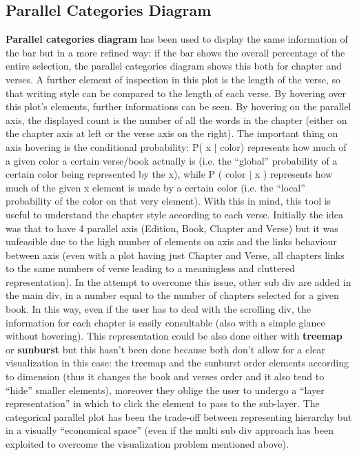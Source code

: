 \documentclass[sigchi]{article}
\begin{document}
\subsection{Parallel Categories Diagram}
\textbf{Parallel categories diagram} \cite{catplot} has been used to display the same information of the bar but in a more refined way: if the bar shows the overall percentage of the entire selection, the parallel categories diagram shows this both for chapter and verses. A further element of inspection in this plot is the length of the verse, so that writing style can be compared to the length of each verse. By hovering over this plot’s elements, further informations can be seen. By hovering on the parallel axis, the displayed count is the number of all the words in the chapter (either on the chapter axis at left or the verse axis on the right). The important thing on axis hovering is the conditional probability: 
P( x $|$ color) represents how much of a given color a certain verse/book actually is (i.e. the “global” probability of a certain color being represented by the x), while P ( color $|$ x ) represents how much of the given x element is made by a certain color (i.e. the “local” probability of the color on that very element). With this in mind, this tool is useful to understand the chapter style according to each verse.
Initially the idea was that to have 4 parallel axis (Edition, Book, Chapter and Verse) but it was unfeasible due to the high number of elements on axis and the links behaviour between axis (even with a plot having just Chapter and Verse, all chapters links to the same numbers of verse leading to a meaningless and cluttered representation). In the attempt to overcome this issue, other sub div are added in the main div, in a number equal to the number of chapters selected for a given book.
In this way, even if the user has to deal with the scrolling div, the information for each chapter is easily consultable  (also with a simple glance without hovering).
This representation could be also done either with \textbf{treemap} \cite{treemap} or \textbf{sunburst} \cite{sunburst} but this hasn’t been done because both don’t allow for a clear visualization in this case: the treemap and the sunburst order elements according to dimension (thus it changes the book and verses order and it also tend to “hide” smaller elements), moreover they oblige the user to undergo a “layer representation” in which to click the element to pass to the sub-layer. The categorical parallel plot has been the trade-off between representing hierarchy but in a visually “economical space” (even if the multi sub div approach has been exploited to overcome the visualization problem mentioned above).
\end{document}

